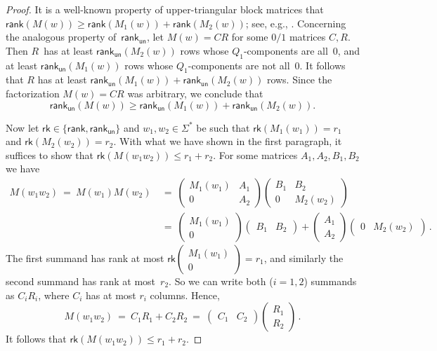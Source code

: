 \documentclass[11pt,a4paper]{amsart}
\newcommand{\rku}{\mathsf{rank}_{\mathsf{un}}}
\newcommand{\rkg}{\mathsf{rank}}
\theoremstyle{plain}
\theoremstyle{definition}
\theoremstyle{defC}
\theoremstyle{thmC}
\theoremstyle{plain}
\numberwithin{equation}{section}
\begin{document}
\begin{proof}
It is a well-known property of upper-triangular block matrices that $\rkg(M(w)) \ge \rkg(M_1(w)) + \rkg(M_2(w))$; see, e.g., \cite[Chapter 0.9.4]{HornJohnson13}.
Concerning the analogous property of~$\rku$, let $M(w) = C R$ for some $0/1$ matrices $C, R$.
Then $R$~has at least $\rku(M_2(w))$ rows whose $Q_1$-components are all~$0$, and at least $\rku(M_1(w))$ rows whose $Q_1$-components are not all~$0$.
It follows that $R$ has at least $\rku(M_1(w)) + \rku(M_2(w))$ rows.
Since the factorization $M(w) = C R$ was arbitrary, we conclude that \[\rku(M(w)) \ge \rku(M_1(w)) + \rku(M_2(w)).\]

\newcommand{\myrank}{\mathsf{rk}}
Now let $\myrank \in \{\rkg, \rku\}$ and $w_1, w_2 \in \Sigma^*$ be such that $\myrank(M_1(w_1)) = r_1$ and $\myrank(M_2(w_2)) = r_2$.
With what we have shown in the first paragraph, it suffices to show that $\myrank(M(w_1 w_2)) \le r_1 + r_2$.
For some matrices $A_1, A_2, B_1, B_2$ we have
\begin{align*}
M(w_1 w_2) \ = \ M(w_1) M(w_2) \ &= \ 
\begin{pmatrix}
    M_1(w_1) & A_1 \\ 0 & A_2
\end{pmatrix}
\begin{pmatrix}
    B_1 & B_2 \\ 0 & M_2(w_2)
\end{pmatrix} \\
&= \ 
\begin{pmatrix}
    M_1(w_1) \\ 0 
\end{pmatrix}
\begin{pmatrix}
    B_1 & B_2 
\end{pmatrix}
+
\begin{pmatrix}
    A_1 \\ A_2
\end{pmatrix}
\begin{pmatrix}
   0 & M_2(w_2)
\end{pmatrix}\,.
\end{align*}
The first summand has rank at most $\myrank \begin{pmatrix}
    M_1(w_1) \\ 0 
\end{pmatrix} = r_1$, and similarly the second summand has rank at most~$r_2$.
So we can write both ($i=1,2$) summands as $C_i R_i$, where $C_i$ has at most $r_i$ columns.
Hence, 
\[
M(w_1 w_2) \ = \ C_1 R_1 + C_2 R_2 \ = \ 
\begin{pmatrix}
    C_1 & C_2 
\end{pmatrix}
\begin{pmatrix}
    R_1 \\ R_2
\end{pmatrix}\,.
\]
It follows that $\myrank(M(w_1 w_2)) \le r_1+r_2$.
\end{proof}
\end{document}
